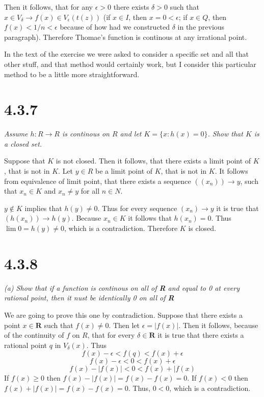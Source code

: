 \documentclass[11pt,oneside,titlepage]{book}
\begin{document}
Then it follows, that for any  $\epsilon > 0$ there exists $\delta > 0$
such that $x \in V_\delta \to f(x) \in V_\epsilon(t(z))$ (if $x \in I$, then
$x = 0 < \epsilon$; if $x \in Q$, then $f(x) < 1/n < \epsilon$ because of
how had
we constructed $\delta$ in the previous paragraph). Therefore Thomae's function
is continous at any irrational point.

In the text of the exercise we were asked to consider a specific set and
all that other stuff,
and that method would certainly work, but I consider this particular method
to be a little more straightforward.

\section*{4.3.7}
\textit{Assume $h: R \to R$ is continous on $R$ and let $K = \{x: h(x) = 0\}$.
  Show that $K$ is a closed set.}

Suppose that $K$ is not closed. Then it follows, that there exists a
limit point of $K$, that is not in $K$. Let $y \in R$ be a limit point
of $K$, that is not in $K$. It follows from equivalence of limit point,
that there exists a sequence
$((x_n)) \to y$, such that $x_n \in K$ and $x_n \neq y$ for all
$n \in N$.

$y \not \in K$ implies that $h(y) \neq 0$. Thus
for every
sequence $(x_n) \to y$ it is true that  $(h(x_n)) \to h(y) $. Because
$x_n \in K$ it follows
that $h(x_n) = 0$. Thus $\lim 0 = h(y) \neq 0$, which
is a contradiction. Therefore $K$ is closed.

\section*{4.3.8}
\textit{(a) Show that if a function is continous on all of \textbf{R} and
  equal to 0 at every rational point, then it nust be identically 0 on all
  of \textbf{R}}

We are going to prove this one by contradiction. Suppose that there exists a
point $x \in \textbf{R}$ such that $f(x) \neq 0$. Then let
$\epsilon = |f(x)|$. Then it follows, because of the continuity of $f$ on $R$,
that for every $\delta \in \textbf{R}$
it is true that there exists a rational point $q$ in $V_\delta(x)$.
Thus
$$f(x) - \epsilon < f(q) < f(x) + \epsilon$$
$$f(x) - \epsilon < 0 < f(x) + \epsilon$$
$$f(x) - |f(x)| < 0 < f(x) + |f(x)$$
If $f(x) \geq 0$ then $f(x) - |f(x)| = f(x) - f(x) = 0$.
If $f(x) < 0$ then $f(x) + |f(x)| = f(x) - f(x) = 0$.
Thus, $0 < 0$, which is a contradiction.
\end{document}
